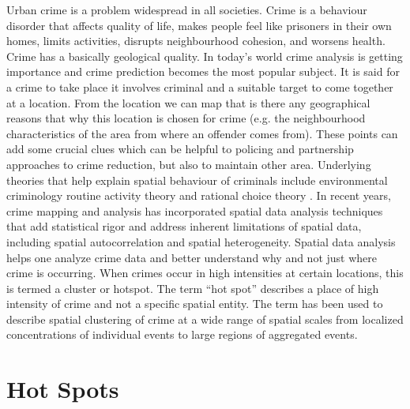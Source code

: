 Urban crime is a problem widespread in all societies. Crime is a behaviour disorder that affects quality of life, makes people feel like prisoners in their own homes, limits activities, disrupts neighbourhood cohesion, and worsens health. Crime has a basically geological quality. In today’s world crime analysis is getting importance and crime prediction becomes the most popular subject. It is said for a crime to take place it involves criminal and a suitable target to come together at a location. From the location we can map that is there any geographical reasons that why this location is chosen for crime (e.g. the neighbourhood characteristics of the area from where an offender comes from). These points can add some crucial clues which can be helpful to policing and partnership approaches to crime reduction, but also to maintain other area. Underlying theories that help explain spatial behaviour of criminals include environmental criminology  routine activity theory  and rational choice theory . In recent years, crime mapping and analysis has incorporated spatial data analysis techniques that add statistical rigor and address inherent limitations of spatial data, including spatial autocorrelation and spatial heterogeneity. Spatial data analysis helps one analyze crime data and better understand why and not just where crime is occurring.
When crimes occur in high intensities at certain locations, this is termed a cluster or hotspot.  The term “hot spot” describes a place of high intensity of crime and not a specific spatial entity. The term has been used to describe spatial clustering of crime at a wide range of spatial scales from localized concentrations of individual events to large regions of aggregated events.
\section{Hot Spots}

